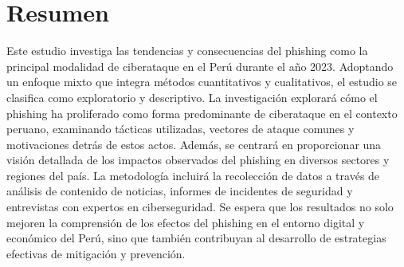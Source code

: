 \frontmatter
{}


\newpage
\section*{Resumen}
Este estudio investiga las tendencias y consecuencias del phishing como la principal modalidad de ciberataque en el Perú durante el año 2023. Adoptando un enfoque mixto que integra métodos cuantitativos y cualitativos, el estudio se clasifica como exploratorio y descriptivo. La investigación explorará cómo el phishing ha proliferado como forma predominante de ciberataque en el contexto peruano, examinando tácticas utilizadas, vectores de ataque comunes y motivaciones detrás de estos actos. Además, se centrará en proporcionar una visión detallada de los impactos observados del phishing en diversos sectores y regiones del país. La metodología incluirá la recolección de datos a través de análisis de contenido de noticias, informes de incidentes de seguridad y entrevistas con expertos en ciberseguridad. Se espera que los resultados no solo mejoren la comprensión de los efectos del phishing en el entorno digital y económico del Perú, sino que también contribuyan al desarrollo de estrategias efectivas de mitigación y prevención.

\let\cleardoublepage\clearpage
\tableofcontents
\let\cleardoublepage\clearpage
